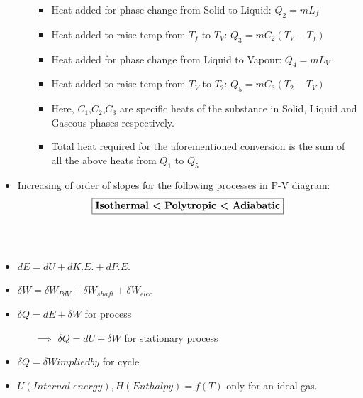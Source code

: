 \documentclass[8pt]{article}
\begin{document}
\begin{itemize}
\begin{itemize}[wide]
\begin{itemize}
				\item Heat added for phase change from Solid to Liquid: $\boxed{Q_2 = mL_f}$
				\item Heat added to raise temp from $T_f$ to $T_V$: $\boxed{Q_3 = mC_2(T_V-T_f)}$
				\item Heat added for phase change from Liquid to Vapour: $\boxed{Q_4 = mL_V}$
				\item Heat added to raise temp from $T_V$ to $T_2$: $\boxed{Q_5 = mC_3(T_2-T_V)}$
				\item Here, $C_1$,$C_2$,$C_3$ are specific heats of the substance in Solid, Liquid and Gaseous phases respectively.
				\item Total heat required for the aforementioned conversion is the sum of all the above heats from $Q_1$ to $Q_5$
			\end{itemize}
		\end{itemize}
	\item Increasing of order of slopes for the following processes in P-V diagram:$$\boxed{\textbf{Isothermal \textless \;Polytropic \textless \;Adiabatic}}$$
\end{itemize}
\hrulefill
\begin{center}
\subsection*{}
\end{center}
\\
	\begin{itemize}
		\item $dE = dU + dK.E. + dP.E.$
		\item $\delta W = \delta W_{PdV} + \delta W_{shaft} + \delta W_{elec} $
		\item $\delta Q = dE + \delta W$ for process
			\begin{itemize}
				\item[$\implies$] $\boxed{\delta Q = dU + \delta W}$ for stationary process
			\end{itemize}
		\item $\delta Q = \delta W impliedby$ for cycle
		\item $U(Internal\;energy),H(Enthalpy) = f(T)$ only for an ideal gas.	
	\end{itemize}\hrulefill\\\\
\end{document}
